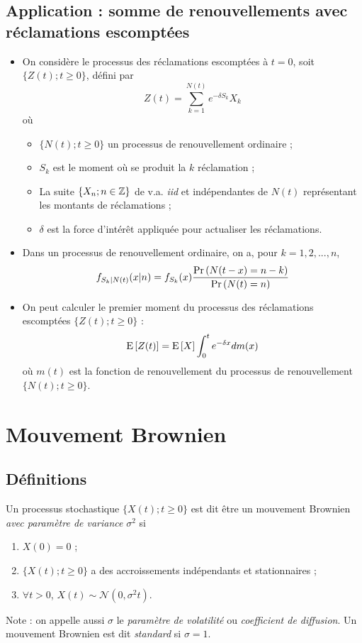 \documentclass[10pt, french]{article}
\begin{document}
\begin{multicols*}{2}
\subsection*{Application : somme de renouvellements avec réclamations escomptées}
\begin{itemize}
\item On considère le processus des réclamations escomptées à $t=0$, soit $\{ Z(t) ; t \geq 0 \}$, défini par
\[Z(t) = \sum_{k=1}^{N(t)} e^{-\delta S_k} X_k  \]
où
\begin{itemize}
	\item $\{N(t) ; t \geq 0 \}$ un processus de renouvellement ordinaire ;
	\item $S_k$ est le moment où se produit la $k$ réclamation ;
	\item La suite $\{ X_n ; n \in \mathbb{Z} \}$ de v.a. \emph{iid} et indépendantes de $N(t)$ représentant les montants de réclamations ;
	\item $\delta$ est la force d'intérêt appliquée pour actualiser les réclamations.
\end{itemize}

\item Dans un processus de renouvellement ordinaire, on a, pour $k = 1, 2, ..., n$,
\begin{align*}
f_{S_k | N(t)}(x | n) = f_{S_k}(x) \frac{\Pr \left( N(t-x) = n-k \right)}{\Pr \left( N(t) = n \right)}
\end{align*}

\item On peut calculer le premier moment du processus des réclamations escomptées $\{ Z(t) ; t \geq 0 \}$ : 
\[\mathrm{E} \left[ Z(t) \right] = \mathrm{E} \left[ X \right] \int_{0}^{t} e^{-\delta x} d m(x) \]
où $m(t)$ est la fonction de renouvellement du processus de renouvellement $\{ N(t) ; t \geq 0 \}$.
\end{itemize}

\section{Mouvement Brownien}
\subsection*{Définitions}
\begin{definition}
Un processus stochastique $\{ X(t) ; t \geq 0 \}$ est dit être un mouvement Brownien \emph{avec paramètre de variance} $\sigma^2$ si
\begin{enumerate}[label=(\arabic*)]
\item $X(0) = 0$ ;
\item $\{ X(t) ; t \geq 0 \}$  a des accroissements indépendants et stationnaires ;
\item $\forall t > 0$, $X(t) \sim \mathcal{N}(0, \sigma^2 t)$.
\end{enumerate}
\end{definition}
Note : on appelle aussi $\sigma$ le \emph{paramètre de volatilité} ou \emph{coefficient de diffusion}. Un mouvement Brownien est dit \emph{standard} si $\sigma = 1$.


\end{multicols*}
\end{document}
